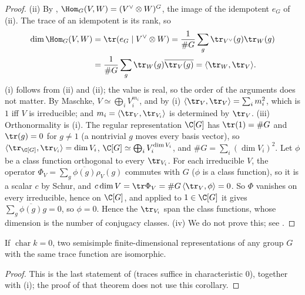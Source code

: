 \begin{proof}
(ii) By , $\Hom_G(V,W)=(V^\vee\otimes W)^G$, the image of the idempotent $e_G$ of (ii). The trace of an
idempotent is its rank, so
\begin{align*}
\dim\Hom_G(V,W)&=\tr(e_G\mid V^\vee\otimes W)=\frac1{\#G}\sum_g\tr_{V^\vee}(g)\tr_W(g)\\
&=\frac1{\#G}\sum_g\tr_W(g)\overline{\tr_V(g)}=\langle\tr_W,\tr_V\rangle.
\end{align*}
(i) follows from (ii) and (ii); the value is real, so the order of the arguments does not matter. By Maschke,
$V\simeq\bigoplus_iV_i^{m_i}$, and by (i) $\langle\tr_V,\tr_V\rangle=\sum_im_i^2$, which is $1$ iff $V$ is irreducible; and $m_i=\langle\tr_V,\tr_{V_i}\rangle$ is determined
by $\tr_V$.
(iii) Orthonormality is (i). The regular representation $\C[G]$ has $\tr(1)=\#G$ and $\tr(g)=0$ for $g\ne1$ (a nontrivial $g$ moves every
basis vector), so $\langle\tr_{\C[G]},\tr_{V_i}\rangle=\dim V_i$, $\C[G]\simeq\bigoplus_iV_i^{\dim V_i}$, and $\#G=\sum_i(\dim V_i)^2$. Let $\phi$ be a class function
orthogonal to every $\tr_{V_i}$. For each irreducible $V$, the operator $\Phi_V=\sum_g\overline{\phi(g)}\rho_V(g)$ commutes with $G$ ($\phi$ is a class
function), so it is a scalar $c$ by Schur, and $c\dim V=\tr\Phi_V=\#G\,\langle\tr_V,\phi\rangle=0$. So $\Phi$ vanishes on every irreducible, hence on $\C[G]$,
and applied to $1\in\C[G]$ it gives $\sum_g\overline{\phi(g)}g=0$, so $\phi=0$. Hence the $\tr_{V_i}$ span the class functions, whose dimension is the
number of conjugacy classes.
(iv) We do not prove this; see \cite[Section 6.5]{SerreLinearReps}.
\end{proof}

\begin{corollary}\label{cor:reps:traces-char0}
If $\operatorname{char}k=0$, two semisimple finite-dimensional representations of any group $G$ with the same trace function are
isomorphic.
\end{corollary}

\begin{proof}
This is the last statement of  (traces suffice in characteristic $0$), together with
(i); the proof of that theorem does not use this corollary.
\end{proof}

